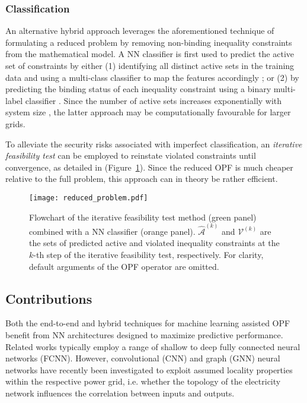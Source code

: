 \documentclass[journal]{IEEEtran}
\begin{document}
\subsubsection{Classification}
An alternative hybrid approach leverages the aforementioned technique of formulating a reduced problem by removing non-binding inequality constraints from the mathematical model. A NN classifier is first used to predict the active set of constraints by either (1) identifying all distinct active sets in the training data and using a multi-class classifier to map the features accordingly \cite{Misra2018}; or (2) by predicting the binding status of each inequality constraint using a binary multi-label classifier \cite{Robson2020}. Since the number of active sets increases exponentially with system size \cite{Deka2019}, the latter approach may be computationally favourable for larger grids.

To alleviate the security risks associated with imperfect classification, an \textit{iterative feasibility test} can be employed to reinstate violated constraints until convergence, as detailed in \cite{Robson2020} (Figure~\ref{fig:reduced_problem}). Since the reduced OPF is much cheaper relative to the full problem, this approach can in theory be rather efficient.

\begin{figure}[!ht]
    \centerline{\texttt{[image: reduced\_problem.pdf]}}
    \caption{Flowchart of the iterative feasibility test method (green panel) combined with a NN classifier (orange panel). $\hat{\mathcal{A}}^{(k)}$ and $\mathcal{V}^{(k)}$ are the sets of predicted active and violated inequality constraints at the $k$-th step of the iterative feasibility test, respectively.  For clarity, default arguments of the OPF operator are omitted.}
    \label{fig:reduced_problem}
\end{figure}

\subsection{Contributions}
Both the end-to-end and hybrid techniques for machine learning assisted OPF benefit from NN architectures designed to maximize predictive performance. Related works typically employ a range of shallow to deep fully connected neural networks (FCNN). However, convolutional (CNN) \cite{Chen2020} and graph (GNN) \cite{Owerko2020, FalconerMones2020, Falconer2020} neural networks have recently been investigated to exploit assumed locality properties within the respective power grid, i.e. whether the topology of the electricity network influences the correlation between inputs and outputs. 
\end{document}
